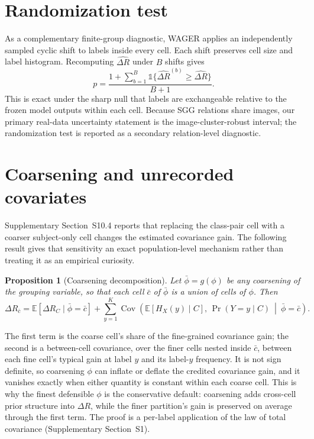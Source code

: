 \documentclass[preprint,times,10pt,a4paper]{elsarticle}
\newcommand{\ind}{\mathds{1}}
\theoremstyle{plain}
\newtheorem{proposition}{Proposition}
\theoremstyle{definition}
\begin{document}
\section{Randomization test}\label{app:randtest}

As a complementary finite-group diagnostic, WAGER applies an independently sampled
cyclic shift to labels inside every cell. Each shift preserves cell size and label
histogram. Recomputing $\widehat{\Delta R}$ under $B$ shifts gives
\begin{equation}
p=\frac{1+\sum_{b=1}^B\ind \{\widehat{\Delta R}^{(b)}\ge
\widehat{\Delta R}\}}{B+1}.
\end{equation}
This is exact under the sharp null that labels are exchangeable relative to the frozen
model outputs within each cell. Because SGG relations share images, our primary
real-data uncertainty statement is the image-cluster-robust interval; the randomization
test is reported as a secondary relation-level diagnostic.

\section{Coarsening and unrecorded covariates}\label{app:coarsen}

Supplementary Section~S10.4 reports that replacing the class-pair cell with a coarser
subject-only cell changes the estimated covariance gain. The following result gives that
sensitivity an exact population-level mechanism rather than treating it as an empirical
curiosity.

\begin{proposition}[Coarsening decomposition]\label{prop:coarsen}
Let $\bar\phi=g(\phi)$ be any coarsening of the grouping variable, so that each cell
$\bar c$ of $\bar\phi$ is a union of cells of $\phi$. Then
\begin{equation}
\Delta R_{\bar c}
=\mathbb E\!\left[\Delta R_C \mid \bar\phi=\bar c\right]
+\sum_{y=1}^K\operatorname{Cov}\!\left(\mathbb E[H_X(y)\mid C],\,
\Pr(Y=y\mid C)\ \middle|\ \bar\phi=\bar c\right).
\label{eq:coarsen}
\end{equation}
\end{proposition}

The first term is the coarse cell's share of the fine-grained covariance gain; the second is
a between-cell covariance, over the finer cells nested inside $\bar c$, between each fine
cell's typical gain at label $y$ and its label-$y$ frequency. It is not sign definite, so
coarsening $\phi$ can inflate or deflate the credited covariance gain, and it vanishes
exactly when either quantity is constant within each coarse cell. This is why the finest
defensible $\phi$ is the conservative default: coarsening adds cross-cell prior structure
into $\Delta R$, while the finer partition's gain is preserved on average through the first
term. The proof is a per-label application of the law of total covariance
(Supplementary Section~S1).
\end{document}
